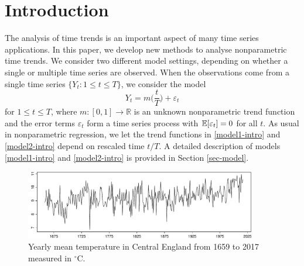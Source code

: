 
\section{Introduction}\label{sec-intro}


The analysis of time trends is an important aspect of many time series applications. In this paper, we develop new methods to analyse nonparametric time trends. 
We consider two different model settings, depending on whether a single or multiple time series are observed. When the observations come from a single time series $\{ Y_t: 1 \le t \le T \}$, we consider the model
\begin{equation}\label{model1-intro}
Y_t = m \Big( \frac{t}{T} \Big) + \varepsilon_t
\end{equation}
for $1 \le t \le T$, where $m: [0,1] \rightarrow \mathbb{R}$ is an unknown nonparametric trend function and the error terms $\varepsilon_t$ form a time series process with $\mathbb{E}[\varepsilon_t] = 0$ for all $t$. As usual in nonparametric regression, we let the trend functions in \eqref{model1-intro} and \eqref{model2-intro} depend on rescaled time $t/T$. A detailed description of models \eqref{model1-intro} and \eqref{model2-intro} is provided in Section \ref{sec-model}.


\begin{figure}
\centering
\includegraphics[width=0.9\textwidth]{Plots/temperature_data.pdf}
\vspace{0.15cm}

\caption{Yearly mean temperature in Central England from 1659 to 2017 measured in $^\circ$C.}\label{yearly_data}
\vspace{-0.15cm}
\end{figure}



